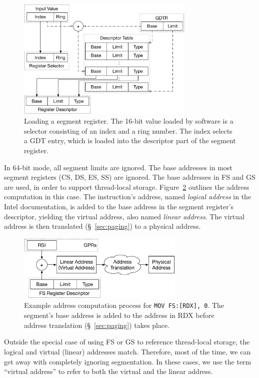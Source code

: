 \begin{figure}[hbt]
  \centering
  \includegraphics[width=85mm]{figures/cpu_segment.pdf}
  \caption{
    Loading a segment register. The 16-bit value loaded by software is a
    selector consisting of an index and a ring number. The index selects a GDT
    entry, which is loaded into the descriptor part of the segment register.
  }
  \label{fig:cpu_segment}
\end{figure}

In 64-bit mode, all segment limits are ignored. The base addresses in most
segment registers (CS, DS, ES, SS) are ignored. The base addresses in FS and GS
are used, in order to support thread-local storage.
Figure~\ref{fig:cpu_segmentation} outlines the address computation in this
case. The instruction's address, named \textit{logical address} in the Intel
documentation, is added to the base address in the segment register's
descriptor, yielding the virtual address, also named \textit{linear address}.
The virtual address is then translated (\S~\ref{sec:paging}) to a physical
address.

\begin{figure}[hbt]
  \centering
  \includegraphics[width=80mm]{figures/cpu_segmentation.pdf}
  \caption{
    Example address computation process for \texttt{MOV FS:[RDX], 0}.  The
    segment's base address is added to the address in RDX before address
    translation (\S~\ref{sec:paging}) takes place.
  }
  \label{fig:cpu_segmentation}
\end{figure}

Outside the special case of using FS or GS to reference thread-local storage,
the logical and virtual (linear) addresses match. Therefore, most of the time,
we can get away with completely ignoring segmentation. In these cases, we use
the term ``virtual address'' to refer to both the virtual and the linear
address.

